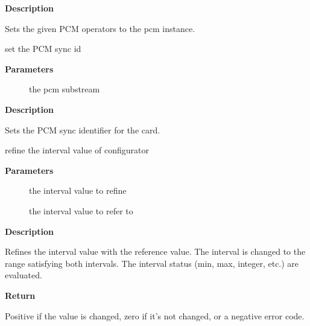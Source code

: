 \documentclass[a4paper,8pt,english]{sphinxmanual}
\begin{document}
\textbf{Description}

Sets the given PCM operators to the pcm instance.

\begin{fulllineitems}
\label{sound/kernel-api/alsa-driver-api:c.snd_pcm_set_sync}
set the PCM sync id

\end{fulllineitems}


\textbf{Parameters}
\begin{description}
\item[{}] \leavevmode
the pcm substream

\end{description}

\textbf{Description}

Sets the PCM sync identifier for the card.

\begin{fulllineitems}
\label{sound/kernel-api/alsa-driver-api:c.snd_interval_refine}
refine the interval value of configurator

\end{fulllineitems}


\textbf{Parameters}
\begin{description}
\item[{}] \leavevmode
the interval value to refine

\item[{}] \leavevmode
the interval value to refer to

\end{description}

\textbf{Description}

Refines the interval value with the reference value.
The interval is changed to the range satisfying both intervals.
The interval status (min, max, integer, etc.) are evaluated.

\textbf{Return}

Positive if the value is changed, zero if it's not changed, or a
negative error code.
\end{document}
